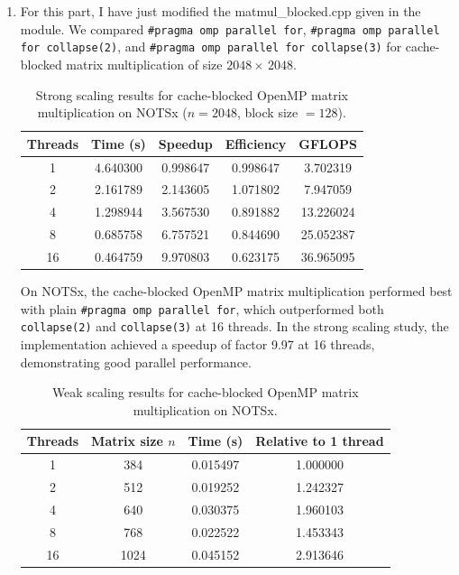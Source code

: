\documentclass{article}[12pt]
\begin{document}
\begin{enumerate}
    \item For this part, I have just modified the matmul\_blocked.cpp given in the module. We compared \texttt{\#pragma omp parallel for}, \texttt{\#pragma omp parallel for collapse(2)}, and \texttt{\#pragma omp parallel for collapse(3)} for cache-blocked matrix multiplication of size $2048 \times\,  2048$.  
    \begin{table}[h!]
\centering
 
\begin{tabular}{|c|c|c|c|c|}
\hline
\textbf{Threads} & \textbf{Time (s)} & \textbf{Speedup} & \textbf{Efficiency} & \textbf{GFLOPS} \\
\hline
1  & 4.640300 & 0.998647 & 0.998647 & 3.702319 \\
2  & 2.161789 & 2.143605 & 1.071802 & 7.947059 \\
4  & 1.298944 & 3.567530 & 0.891882 & 13.226024 \\
8  & 0.685758 & 6.757521 & 0.844690 & 25.052387 \\
16 & 0.464759 & 9.970803 & 0.623175 & 36.965095 \\
\hline
\end{tabular}
\caption{Strong scaling results for cache-blocked OpenMP matrix multiplication on NOTSx ($n=2048$, block size $=128$).}
\label{tab:blocked_strong_notsx}
\end{table}

On NOTSx, the cache-blocked OpenMP matrix multiplication performed best with plain \texttt{\#pragma omp parallel for}, which outperformed both \texttt{collapse(2)} and \texttt{collapse(3)} at 16 threads. In the strong scaling study, the implementation achieved a speedup of factor 9.97 at 16 threads, demonstrating good parallel performance.

\begin{table}[h!]
\centering
 
\begin{tabular}{|c|c|c|c|}
\hline
\textbf{Threads} & \textbf{Matrix size $n$} & \textbf{Time (s)} & \textbf{Relative to 1 thread} \\
\hline
1  & 384  & 0.015497 & 1.000000 \\
2  & 512  & 0.019252 & 1.242327 \\
4  & 640  & 0.030375 & 1.960103 \\
8  & 768  & 0.022522 & 1.453343 \\
16 & 1024 & 0.045152 & 2.913646 \\
\hline
\end{tabular}
\caption{Weak scaling results for cache-blocked OpenMP matrix multiplication on NOTSx.}
\label{tab:blocked_weak_notsx}
\end{table}


\end{enumerate}
\end{document}
